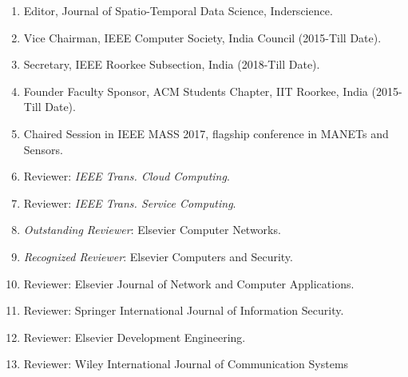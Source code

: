 \begin{enumerate}
	\item Editor, Journal of Spatio-Temporal Data Science, Inderscience.

	\item Vice Chairman, IEEE Computer Society, India Council (2015-Till Date).

	\item Secretary, IEEE Roorkee Subsection, India (2018-Till Date).

	\item Founder Faculty Sponsor, ACM Students Chapter, IIT Roorkee, India (2015-Till Date).
	
	\item Chaired Session in IEEE MASS 2017, flagship conference in MANETs and Sensors.
		
	\item Reviewer: \textit{IEEE Trans. Cloud Computing}.
	
	\item Reviewer: \textit{IEEE Trans. Service Computing}.
	
	\item \textit{ Outstanding Reviewer}: Elsevier Computer Networks.

	\item \textit{Recognized Reviewer}: Elsevier Computers and Security.

	\item Reviewer: Elsevier Journal of Network and Computer Applications.
	
	\item Reviewer: Springer International Journal of Information Security.
	
	\item Reviewer: Elsevier Development Engineering. 
	
	\item Reviewer: Wiley International Journal of Communication Systems

	\end{enumerate}
	
